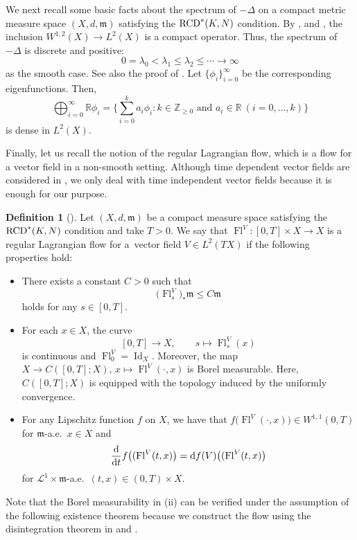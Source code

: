 \documentclass[pdftex]{sigma}
\numberwithin{equation}{section}
\theoremstyle{definition}
\newtheorem{Def}[Thm]{Definition}
\newcommand{\Id}{\operatorname{Id}}
\newcommand{\Fl}{\operatorname{Fl}}
\newcommand{\R}{\mathbb{R}}
\newcommand{\Z}{\mathbb{Z}}
\newcommand{\mf}{\mathfrak{m}}
\newcommand{\RCD}{{\rm RCD}^\ast}
\begin{document}
{\samepage
We next recall some basic facts about the spectrum of $-\Delta$ on a compact metric measure space $(X,d,\mf)$ satisfying the $\RCD(K,N)$ condition.
By \cite[Theorem~1.1]{Raj}, \cite[Theorem~1]{HK} and \cite[Theorem~8.1]{HK2}, the inclusion $W^{1,2}(X)\to L^2(X)$ is a compact operator.
Thus, the spectrum of~$-\Delta$ is discrete and positive:
\[
0=\lambda_0<\lambda_1\leq \lambda_2\leq\cdots\to \infty
\]
as the smooth case.
See also the proof of \cite[Theorem~4.22]{EKS}.
Let $\{\phi_i\}_{i=0}^\infty$ be the corresponding eigenfunctions.
Then,
\[
\bigoplus_{i=0}^\infty \R\phi_i=\bigg\{\sum_{i=0}^k a_i \phi_i\colon k\in\Z_{\geq 0}\text{ and }a_i\in \R\ (i=0,\ldots,k)\bigg\}
\]
is dense in $L^2(X)$.

}

Finally, let us recall the notion of the regular Lagrangian flow, which is a flow for a vector field in a non-smooth setting.
Although time dependent vector fields are considered in \cite{AT1}, we only deal with time independent vector fields because it is enough for our purpose.
\begin{Def}[\cite{AT1}]
Let $(X,d,\mf)$ be a compact measure space satisfying the $\RCD(K,N)$ condition and take $T>0$.
We say that $\Fl^V \colon [0,T]\times X\to X$ is a regular Lagrangian flow for a~vector field $V\in L^2(T X)$ if
the following properties hold:
\begin{itemize}\itemsep=0pt
\item[(i)] There exists a constant $C>0$ such that
\[
\big(\Fl^V_s\big)_\ast \mf\leq C \mf
\]
holds for any $s\in [0,T]$.
\item[(ii)] For each $x\in X$, the curve
\[
[0,T]\to X,\qquad
s\mapsto \Fl_s^V(x)
\]
is continuous and $\Fl_0^V=\Id_X$.
Moreover, the map $X\to C([0,T];X),\, x\mapsto \Fl^V(\cdot,x)$ is Borel measurable.
Here, $C([0,T];X)$ is equipped with the topology induced by the uniformly convergence.
\item[(iii)] For any Lipschitz function $f$ on $X$,
we have that
$f\big(\Fl^V(\cdot ,x)\big)\in W^{1,1}(0,T)$ for $\mf$-a.e.\ $x\in X$ and
\[
\frac{\rm d}{{\rm d} t}f\big((\Fl^V(t,x)\big)={\rm d} f(V) \big((\Fl^V(t,x)\big)
\]
for $\mathcal{L}^1\times\mf $-a.e.\ $(t,x)\in (0,T)\times X$.
\end{itemize}
\end{Def}
Note that the Borel measurability in (ii) can be verified under the assumption of the following existence theorem because we construct the flow using the disintegration theorem in \cite[Theorem~8.4]{AT1} and \cite[Theorem~7.8]{AT2}.
\end{document}
